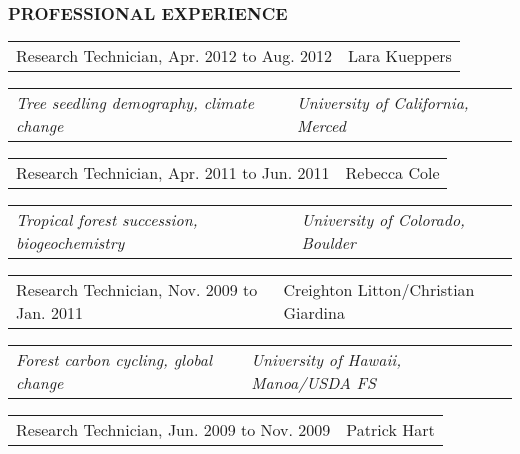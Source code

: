 \documentclass[11pt,english]{article}
\providecommand{\tabularnewline}{\\}
\begin{document}

\vspace{1.5ex}
\subsubsection*{PROFESSIONAL EXPERIENCE}
\vspace{-0.5ex}

\begin{tabular}{>{\raggedright}p{3.25in}>{\raggedleft}p{2.75in}}
Research Technician, Apr. 2012 to Aug. 2012 & Lara Kueppers \tabularnewline
\end{tabular}

\begin{tabular}{>{\raggedright}p{3.25in}>{\raggedleft}p{2.75in}}
\hspace{1.5em}\emph{Tree seedling demography, climate change} & \emph{University of California, Merced} %
\end{tabular}
\vspace{-2ex}

\begin{tabular}{>{\raggedright}p{3.25in}>{\raggedleft}p{2.75in}}
Research Technician, Apr. 2011 to Jun. 2011 & Rebecca Cole\tabularnewline
\end{tabular}

\begin{tabular}{>{\raggedright}p{3.25in}>{\raggedleft}p{=2.75in}}
\hspace{1.5em}\emph{Tropical forest succession, biogeochemistry} & \emph{University of Colorado, Boulder}\tabularnewline
\end{tabular}
\vspace{-2ex}

\begin{tabular}{>{\raggedright}p{3.25in}>{\raggedleft}p{2.75in}}
Research Technician, Nov. 2009 to Jan. 2011 & Creighton Litton/Christian Giardina\tabularnewline
\end{tabular}

\begin{tabular}{>{\raggedright}p{3.25in}>{\raggedleft}p{2.75in}}
\hspace{1.5em}\emph{Forest carbon cycling, global change} & \emph{University of Hawaii, Manoa/USDA FS}\tabularnewline
\end{tabular}
\vspace{-2ex}

\begin{tabular}{>{\raggedright}p{3.25in}>{\raggedleft}p{2.75in}}
Research Technician, Jun. 2009 to Nov. 2009 & Patrick Hart\tabularnewline
\end{tabular}
\end{document}
